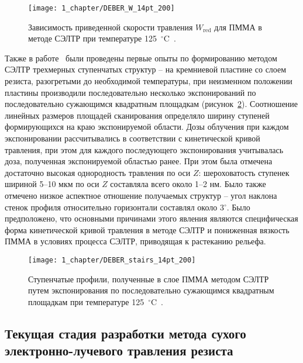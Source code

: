 \begin{figure}[b]
	\centering
	\texttt{[image: 1\_chapter/DEBER\_W\_14pt\_200]}
	\vspace{0.2em}
	\caption{Зависимость приведенной скорости травления $W_\mathrm{red}$ для ПММА в методе СЭЛТР при температуре 125~$^\circ$C~\cite{Bruk_2013}.}
	\label{fig:DEBER_W}
\end{figure}

Также в работе~\cite{Bruk_2013} были проведены первые опыты по формированию методом СЭЛТР трехмерных ступенчатых структур -- на кремниевой пластине со слоем резиста, разогретыми до необходимой температуры, при неизменном положении пластины производили последовательно несколько экспонирований по последовательно сужающимся квадратным площадкам (рисунок~\ref{fig:DEBER_stairs}). Соотношение линейных размеров площадей сканирования определяло ширину ступеней формирующихся на краю экспонируемой области. Дозы облучения при каждом экспонировании рассчитывались в соответствии с кинетической кривой травления, при этом для каждого последующего экспонирования учитывалась доза, полученная экспонируемой областью ранее. При этом была отмечена достаточно высокая однородность травления по оси $Z$: шероховатость ступенек шириной 5–10 мкм по оси $Z$ составляла всего около 1–2 нм.
Было также отмечено низкое аспектное отношение получаемых структур -- угол наклона стенок профиля относительно горизонтали составлял около 3$^\circ$. Было предположено, что основными причинами этого явления являются специфическая форма кинетической кривой травления в методе СЭЛТР и пониженная вязкость ПММА в условиях процесса СЭЛТР, приводящая к растеканию рельефа.

\begin{figure}[h]
	\centering
	\vspace{0.2em}
	\texttt{[image: 1\_chapter/DEBER\_stairs\_14pt\_200]}
	\vspace{0.5em}
	\caption{Ступенчатые профили, полученные в слое ПММА методом СЭЛТР путем экспонирования по последовательно сужающимся квадратным площадкам при температуре 125~$^\circ$C~\cite{Bruk_2013}. \vspace{1.5em}}
	\label{fig:DEBER_stairs}
\end{figure}


\subsection{Текущая стадия разработки метода сухого электронно-лучевого травления резиста}

